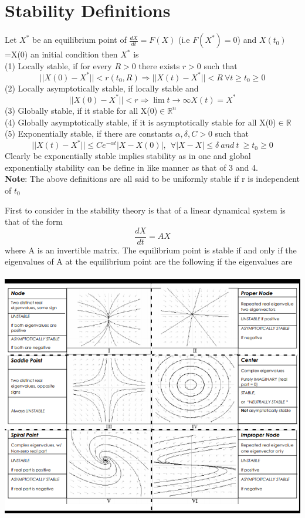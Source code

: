 \documentclass[a4paper,12pt]{report}
\numberwithin{equation}{section}
\begin{document}
\section*{Stability Definitions}
Let $ X^* $ be an equilibrium point of $ \frac{dX}{dt}= F(X)$ (i.e $ F(X^* )= 0$) and $X(t_0)$=X(0) an initial condition then $X^*$ is \\
(1) Locally stable, if for every $R>0$ there exists $r>0$ such that 
\begin{equation*}
|| X(0) - X^{*} ||<r(t_{0},R) \Longrightarrow || X(t) - X^* ||<R
 \  \forall t \geq t_0 \geq 0 
\end{equation*}  
(2) Locally asymptotically stable, if locally stable and 
\begin{equation*}
|| X(0)- X^*||<r \Longrightarrow \displaystyle{\lim t\to \infty} X(t)=X^* 
\end{equation*}
(3) Globally stable, if it stable for all X(0)$ \in \mathbb{R}^n$ \\
(4) Globally asymptotically stable, if it is asymptotically stable for all X(0)$\in \mathbb{R}$ \\
(5) Exponentially stable, if there are constants $\alpha,\delta,C >0$ such that 
\begin{equation}
||X(t)- X^*|| \leq Ce^{- \alpha t}|X - X(0)|, \ \ \forall | X - X|\leq \delta \ and \ t \ \geq t_0 \geq 0
\end{equation}
Clearly be exponentially stable implies stability as in one and global exponentially stability can be define in like manner as that of 3 and 4. \\
\textbf{Note}: The above definitions are all said to be uniformly stable if r is independent of $t_0$


First to consider in the stability theory is that of a linear dynamical system is that of the form 
\begin{equation} \frac{dX}{dt}=AX 
\end{equation}
where A is an invertible matrix. The equilibrium point is stable if and only if the eigenvalues of A at the equilibrium point are the following if the eigenvalues are \\\\
\includegraphics[scale=0.8]{1}
\end{document}
